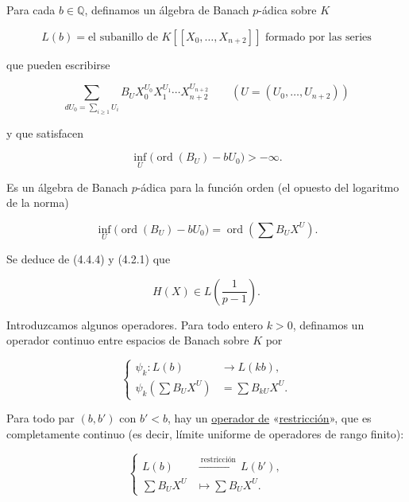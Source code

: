 Para cada $b\in\mathbb Q$, definamos un álgebra de Banach $p$-ádica sobre
$K$

\begin{equation}\tag{4.5.1}
L(b)=\text{el subanillo de $K[[X_0,\ldots,X_{n+2}]]$ formado por las series}
\end{equation}

que pueden escribirse

\begin{equation}\tag{4.5.2}
\sum_{dU_0=\sum_{i\geq1}U_i}
B_UX_0^{U_0}X_1^{U_1}\cdots X_{n+2}^{U_{n+2}}
\qquad (U=(U_0,\ldots,U_{n+2}))
\end{equation}

y que satisfacen

\begin{equation}\tag{4.5.3}
\inf_U\bigl(\operatorname{ord}(B_U)-bU_0\bigr)>-\infty.
\end{equation}

Es un álgebra de Banach $p$-ádica para la función orden (el opuesto del
logaritmo de la norma)

\begin{equation}\tag{4.5.4}
\inf_U\bigl(\operatorname{ord}(B_U)-bU_0\bigr)
=\operatorname{ord}\!\left(\sum B_UX^U\right).
\end{equation}

Se deduce de (4.4.4) y (4.2.1) que

\[
H(X)\in L\!\left(\frac1{p-1}\right).
\]

\pageoriginale

Introduzcamos algunos operadores. Para todo entero $k>0$, definamos un
operador continuo entre espacios de Banach sobre $K$ por

\begin{equation}\tag{4.5.5}
\left\{
\begin{aligned}
\psi_k:L(b)&\longrightarrow L(kb),\\
\psi_k\!\left(\sum B_UX^U\right)&=\sum B_{kU}X^U.
\end{aligned}
\right.
\end{equation}

Para todo par $(b,b')$ con $b'<b$, hay un \underline{operador de} «\underline{restricción}», que
es completamente continuo (es decir, límite uniforme de operadores de
rango finito):

\begin{equation}\tag{4.5.6}
\left\{
\begin{aligned}
L(b)&\xrightarrow{\ \text{restricción}\ }L(b'),\\
\sum B_UX^U&\longmapsto\sum B_UX^U.
\end{aligned}
\right.
\end{equation}

